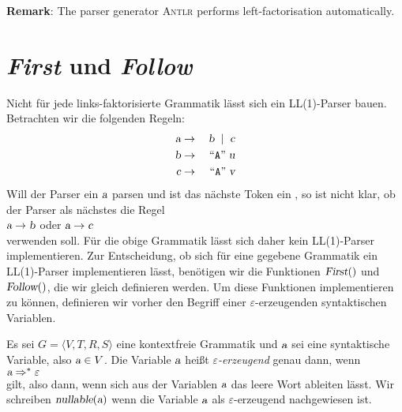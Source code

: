 \noindent
\textbf{Remark}: The parser generator \textsc{Antlr} performs left-factorisation automatically.


\section{\textsl{First} und \textsl{Follow}}
Nicht für jede links-faktorisierte Grammatik lässt sich ein LL(1)-Parser bauen.  Betrachten
wir die folgenden Regeln:
\begin{eqnarray*}
  \textsl{a} & \rightarrow & \textsl{b} \; \mid\; \textsl{c} \\
  \textsl{b} & \rightarrow & \;\mbox{``\texttt{A}''}\; \textsl{u}  \\
  \textsl{c} & \rightarrow & \;\mbox{``\texttt{A}''}\; \textsl{v}  
\end{eqnarray*}
Will der Parser ein $\textsl{a}$ parsen und ist das nächste Token ein , so ist nicht klar,
ob der Parser als nächstes die Regel
\\[0.2cm]
\hspace*{1.3cm}
$\textsl{a} \rightarrow \textsl{b}$ \quad oder \quad $\textsl{a} \rightarrow \textsl{c}$
\\[0.2cm]
verwenden soll.  Für die obige Grammatik lässt sich daher kein LL(1)-Parser implementieren.
Zur Entscheidung, ob sich für eine gegebene Grammatik ein LL(1)-Parser implementieren lässt,
benötigen wir die Funktionen $\textsl{First}()$ und $\textsl{Follow}()$, die wir gleich
definieren werden.  Um diese Funktionen implementieren zu können, definieren wir vorher  den
Begriff einer $\varepsilon$-erzeugenden syntaktischen Variablen.

\begin{Definition}
Es sei $G = \langle V, T, R, S \rangle$ eine kontextfreie Grammatik und $\textsl{a}$ sei eine
syntaktische Variable, also $\textsl{a} \in V$.  Die Variable $\textsl{a}$ heißt 
\emph{$\varepsilon$-erzeugend} genau dann, wenn
\\[0.2cm]
\hspace*{1.3cm}
$\textsl{a} \Rightarrow^* \varepsilon$
\\[0.2cm]
gilt, also dann, wenn sich aus der Variablen $\textsl{a}$ das leere Wort ableiten lässt. 
Wir schreiben $\textsl{nullable}(\textsl{a})$ wenn die Variable $\textsl{a}$ als $\varepsilon$-erzeugend
nachgewiesen ist.
\eox
\end{Definition}


